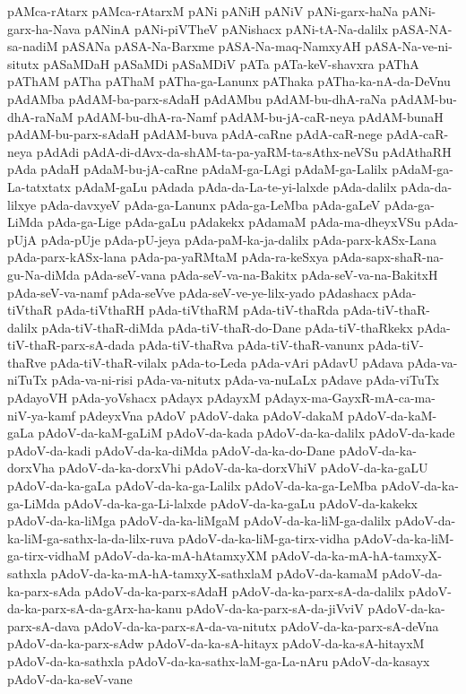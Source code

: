 {pAMca-rAtarx
pAMca-rAtarxM
pANi
pANiH
pANiV
pANi-garx-haNa
pANi-garx-ha-Nava
pANinA
pANi-piVTheV
pANishacx
pANi-tA-Na-dalilx
pASA-NA-sa-nadiM
pASANa
pASA-Na-Barxme
pASA-Na-maq-NamxyAH
pASA-Na-ve-ni-situtx
pASaMDaH
pASaMDi
pASaMDiV
pATa
pATa-keV-shavxra
pAThA
pAThAM
pATha
pAThaM
pATha-ga-Lanunx
pAThaka
pATha-ka-nA-da-DeVnu
pAdAMba
pAdAM-ba-parx-sAdaH
pAdAMbu
pAdAM-bu-dhA-raNa
pAdAM-bu-dhA-raNaM
pAdAM-bu-dhA-ra-Namf
pAdAM-bu-jA-caR-neya
pAdAM-bunaH
pAdAM-bu-parx-sAdaH
pAdAM-buva
pAdA-caRne
pAdA-caR-nege
pAdA-caR-neya
pAdAdi
pAdA-di-dAvx-da-shAM-ta-pa-yaRM-ta-sAthx-neVSu
pAdAthaRH
pAda
pAdaH
pAdaM-bu-jA-caRne
pAdaM-ga-LAgi
pAdaM-ga-Lalilx
pAdaM-ga-La-tatxtatx
pAdaM-gaLu
pAdada
pAda-da-La-te-yi-lalxde
pAda-dalilx
pAda-da-lilxye
pAda-davxyeV
pAda-ga-Lanunx
pAda-ga-LeMba
pAda-gaLeV
pAda-ga-LiMda
pAda-ga-Lige
pAda-gaLu
pAdakekx
pAdamaM
pAda-ma-dheyxVSu
pAda-pUjA
pAda-pUje
pAda-pU-jeya
pAda-paM-ka-ja-dalilx
pAda-parx-kASx-Lana
pAda-parx-kASx-lana
pAda-pa-yaRMtaM
pAda-ra-keSxya
pAda-sapx-shaR-na-gu-Na-diMda
pAda-seV-vana
pAda-seV-va-na-Bakitx
pAda-seV-va-na-BakitxH
pAda-seV-va-namf
pAda-seVve
pAda-seV-ve-ye-lilx-yado
pAdashacx
pAda-tiVthaR
pAda-tiVthaRH
pAda-tiVthaRM
pAda-tiV-thaRda
pAda-tiV-thaR-dalilx
pAda-tiV-thaR-diMda
pAda-tiV-thaR-do-Dane
pAda-tiV-thaRkekx
pAda-tiV-thaR-parx-sA-dada
pAda-tiV-thaRva
pAda-tiV-thaR-vanunx
pAda-tiV-thaRve
pAda-tiV-thaR-vilalx
pAda-to-Leda
pAda-vAri
pAdavU
pAdava
pAda-va-niTuTx
pAda-va-ni-risi
pAda-va-nitutx
pAda-va-nuLaLx
pAdave
pAda-viTuTx
pAdayoVH
pAda-yoVshacx
pAdayx
pAdayxM
pAdayx-ma-GayxR-mA-ca-ma-niV-ya-kamf
pAdeyxVna
pAdoV
pAdoV-daka
pAdoV-dakaM
pAdoV-da-kaM-gaLa
pAdoV-da-kaM-gaLiM
pAdoV-da-kada
pAdoV-da-ka-dalilx
pAdoV-da-kade
pAdoV-da-kadi
pAdoV-da-ka-diMda
pAdoV-da-ka-do-Dane
pAdoV-da-ka-dorxVha
pAdoV-da-ka-dorxVhi
pAdoV-da-ka-dorxVhiV
pAdoV-da-ka-gaLU
pAdoV-da-ka-gaLa
pAdoV-da-ka-ga-Lalilx
pAdoV-da-ka-ga-LeMba
pAdoV-da-ka-ga-LiMda
pAdoV-da-ka-ga-Li-lalxde
pAdoV-da-ka-gaLu
pAdoV-da-kakekx
pAdoV-da-ka-liMga
pAdoV-da-ka-liMgaM
pAdoV-da-ka-liM-ga-dalilx
pAdoV-da-ka-liM-ga-sathx-la-da-lilx-ruva
pAdoV-da-ka-liM-ga-tirx-vidha
pAdoV-da-ka-liM-ga-tirx-vidhaM
pAdoV-da-ka-mA-hAtamxyXM
pAdoV-da-ka-mA-hA-tamxyX-sathxla
pAdoV-da-ka-mA-hA-tamxyX-sathxlaM
pAdoV-da-kamaM
pAdoV-da-ka-parx-sAda
pAdoV-da-ka-parx-sAdaH
pAdoV-da-ka-parx-sA-da-dalilx
pAdoV-da-ka-parx-sA-da-gArx-ha-kanu
pAdoV-da-ka-parx-sA-da-jiVviV
pAdoV-da-ka-parx-sA-dava
pAdoV-da-ka-parx-sA-da-va-nitutx
pAdoV-da-ka-parx-sA-deVna
pAdoV-da-ka-parx-sAdw
pAdoV-da-ka-sA-hitayx
pAdoV-da-ka-sA-hitayxM
pAdoV-da-ka-sathxla
pAdoV-da-ka-sathx-laM-ga-La-nAru
pAdoV-da-kasayx
pAdoV-da-ka-seV-vane
}

